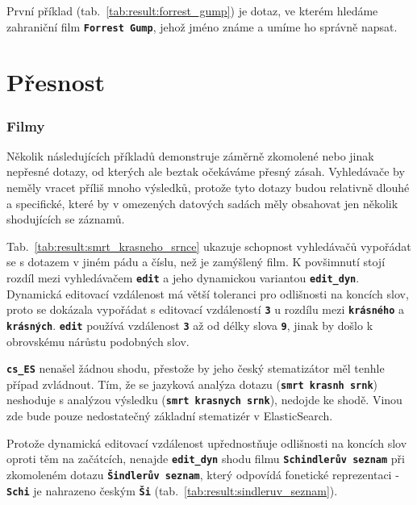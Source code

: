 \documentclass[11pt,letterpaper,oneside,openright]{book}
\newcommand{\bftt}[1]{\texttt{\textbf{#1}}}
\begin{document}
\mbox{}\mbox{}

První příklad (tab.~\ref{tab:result:forrest_gump}) je dotaz, ve kterém hledáme
zahraniční film \bftt{Forrest Gump}, jehož jméno známe a umíme ho správně
napsat.

\section{Přesnost}
\subsubsection{Filmy}
Několik následujících příkladů demonstruje záměrně zkomolené nebo jinak
nepřesné dotazy, od kterých ale beztak očekáváme přesný zásah.
Vyhledávače by neměly vracet příliš mnoho výsledků, protože tyto dotazy
budou relativně dlouhé a specifické, které by v omezených datových
sadách měly obsahovat jen několik shodujících se záznamů.

\mbox{}\mbox{}

Tab.~\ref{tab:result:smrt_krasneho_srnce} ukazuje schopnost vyhledávačů
vypořádat se s dotazem v jiném pádu a číslu, než je zamýšlený film. K
povšimnutí stojí rozdíl mezi vyhledávačem \bftt{edit} a jeho dynamickou
variantou \bftt{edit\_dyn}. Dynamická editovací vzdálenost má větší toleranci
pro odlišnosti na koncích slov, proto se dokázala vypořádat s editovací
vzdáleností \bftt{3} u rozdílu mezi \bftt{krásného} a \bftt{krásných}.
\bftt{edit} používá vzdálenost \bftt{3} až od délky slova \bftt{9}, jinak by
došlo k obrovskému nárůstu podobných slov.

\bftt{cs\_ES} nenašel žádnou shodu, přestože by jeho český stematizátor měl
tenhle případ zvládnout. Tím, že se jazyková analýza dotazu
(\bftt{smrt~krasnh~srnk}) neshoduje s analýzou výsledku
(\bftt{smrt~krasnych~srnk}), nedojde ke shodě. Vinou zde bude pouze
nedostatečný základní stematizér v ElasticSearch.

\mbox{}\mbox{}

Protože dynamická editovací vzdálenost upřednostňuje odlišnosti na
koncích slov oproti těm na začátcích, nenajde \bftt{edit\_dyn} shodu
filmu \bftt{Schindlerův seznam} při zkomoleném dotazu \bftt{Šindlerův
seznam}, který odpovídá fonetické reprezentaci - \bftt{Schi} je
nahrazeno českým \bftt{Ši} (tab.~\ref{tab:result:sindleruv_seznam}).

\mbox{}\mbox{}
\end{document}
